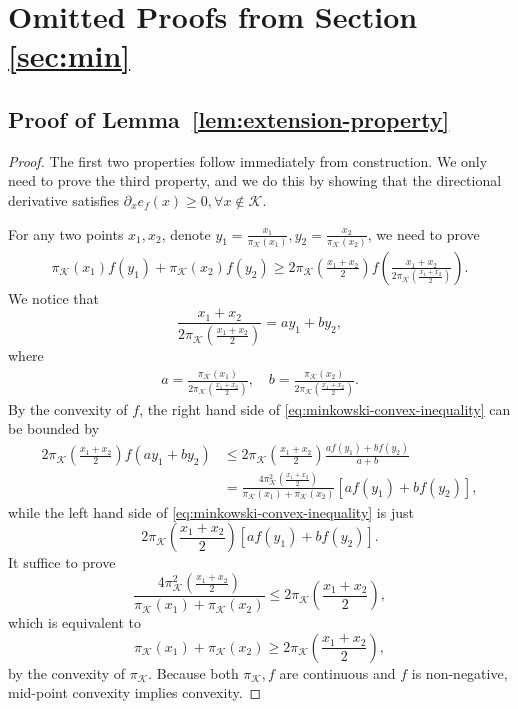 \tableofcontents

\newpage

\section{Omitted Proofs from Section \ref{sec:min}}

\subsection{Proof of Lemma~\ref{lem:extension-property}}
\begin{proof} The first two properties follow immediately from construction. 
    We only need to prove the third property, and we do this by showing that the directional derivative satisfies $\partial_x e_f(x)\ge 0, \forall x\notin \mathcal{K}$.
    
    For any two points $x_1,x_2$, denote $y_1=\frac{x_1}{\pi_{\mathcal{K}}(x_1)}, y_2=\frac{x_2}{\pi_{\mathcal{K}}(x_2)}$, we need to prove
    \begin{align}
    \label{eq:minkowski-convex-inequality}
    \pi_{\mathcal{K}}(x_1)f(y_1)+\pi_{\mathcal{K}}(x_2)f(y_2)\ge 2\pi_{\mathcal{K}}\left(\frac{x_1+x_2}{2}\right)f\left(\frac{x_1+x_2}{2\pi_{\mathcal{K}}\left(\frac{x_1+x_2}{2}\right)}\right).
    \end{align}
    We notice that
    $$
    \frac{x_1+x_2}{2\pi_{\mathcal{K}}(\frac{x_1+x_2}{2})}=ay_1+by_2,
    $$
    where 
    \begin{align*}
        a=\frac{\pi_{\mathcal{K}}(x_1)}{2\pi_{\mathcal{K}}\left(\frac{x_1+x_2}{2}\right)}, \quad b=\frac{\pi_{\mathcal{K}}(x_2)}{2\pi_{\mathcal{K}}(\frac{x_1+x_2}{2})}.
    \end{align*}
    By the convexity of $f$, the right hand side of \cref{eq:minkowski-convex-inequality} can be bounded by
    \begin{align*}
    2\pi_{\mathcal{K}}\left(\frac{x_1+x_2}{2}\right)f(ay_1+by_2)&\le 2\pi_{\mathcal{K}}\left(\frac{x_1+x_2}{2}\right)\frac{af(y_1)+bf(y_2)}{a+b}\\
    &=\frac{4\pi_{\mathcal{K}}^2\left(\frac{x_1+x_2}{2}\right)}{\pi_{\mathcal{K}}(x_1)+\pi_{\mathcal{K}}(x_2)}[af(y_1)+bf(y_2)],
    \end{align*}
    while the left hand side of \cref{eq:minkowski-convex-inequality} is just
    $$
    2\pi_{\mathcal{K}}\left(\frac{x_1+x_2}{2}\right)[af(y_1)+bf(y_2)].
    $$
    It suffice to prove 
    $$
    \frac{4\pi_{\mathcal{K}}^2\left(\frac{x_1+x_2}{2}\right)}{\pi_{\mathcal{K}}(x_1)+\pi_{\mathcal{K}}(x_2)}\le 2\pi_{\mathcal{K}}\left(\frac{x_1+x_2}{2}\right),
    $$
    which is equivalent to 
    $$
    \pi_{\mathcal{K}}(x_1)+\pi_{\mathcal{K}}(x_2)\ge 2\pi_{\mathcal{K}}\left(\frac{x_1+x_2}{2}\right),
    $$
    by the convexity of $\pi_{\mathcal{K}}$. Because both $\pi_{\mathcal{K}}, f$ are continuous and $f$ is non-negative, mid-point convexity implies convexity.
\end{proof}




